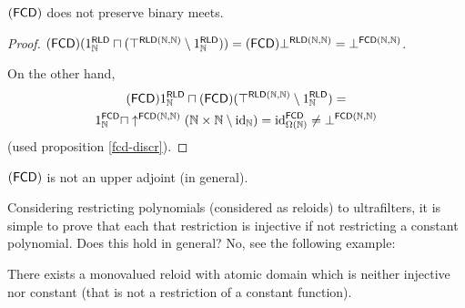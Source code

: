 \begin{example}
$(\mathsf{FCD})$ does not preserve binary meets.\end{example}
\begin{proof}
$(\mathsf{FCD})(1_{\mathbb{N}}^{\mathsf{RLD}}\sqcap(\top^{\mathsf{RLD}(\mathbb{N},\mathbb{N})}\setminus1_{\mathbb{N}}^{\mathsf{RLD}}))=(\mathsf{FCD})\bot^{\mathsf{RLD}(\mathbb{N},\mathbb{N})}=\bot^{\mathsf{FCD}(\mathbb{N},\mathbb{N})}$.

On the other hand,
\begin{multline*}
(\mathsf{FCD})1_{\mathbb{N}}^{\mathsf{RLD}}\sqcap(\mathsf{FCD})(\top^{\mathsf{RLD}(\mathbb{N},\mathbb{N})}\setminus1_{\mathbb{N}}^{\mathsf{RLD}})=\\
1_{\mathbb{N}}^{\mathsf{FCD}}\sqcap\uparrow^{\mathsf{FCD}(\mathbb{N},\mathbb{N})}(\mathbb{N}\times\mathbb{N}\setminus{\operatorname{id}}_{\mathbb{N}})={\operatorname{id}}_{\Omega(\mathbb{N})}^{\mathsf{FCD}}\ne\bot^{\mathsf{FCD}(\mathbb{N},\mathbb{N})}
\end{multline*}
(used proposition \ref{fcd-discr}).\end{proof}
\begin{cor}
$(\mathsf{FCD})$ is not an upper adjoint (in general).
\end{cor}
Considering restricting polynomials (considered as reloids) to ultrafilters,
it is simple to prove that each that restriction is injective if not
restricting a constant polynomial. Does this hold in general? No,
see the following example:
\begin{example}
There exists a monovalued reloid with atomic domain which is neither
injective nor constant (that is not a restriction of a constant function).\end{example}
